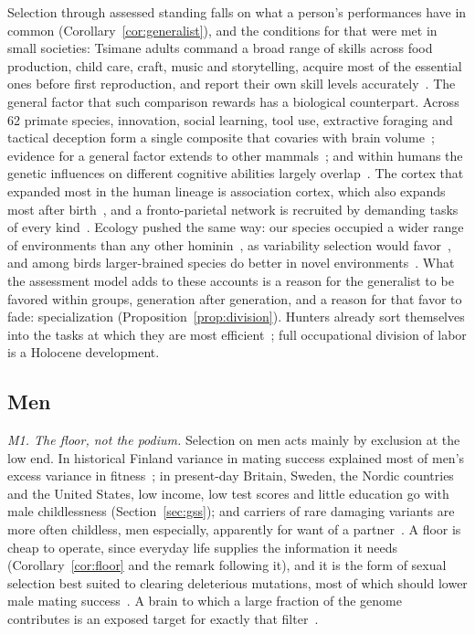 Selection through assessed standing falls on what a person's performances have in common
(Corollary~\ref{cor:generalist}), and the conditions for that were met in small societies: Tsimane adults command a broad
range of skills across food production, child care, craft, music and storytelling, acquire most of the essential ones before
first reproduction, and report their own skill levels accurately~\cite{schniter2015}. The general factor that such comparison
rewards has a biological counterpart. Across 62 primate species, innovation, social learning, tool use, extractive
foraging and tactical deception form a single composite that covaries with brain volume~\cite{reader2011}; evidence for a
general factor extends to other mammals~\cite{burkart2017}; and within humans the genetic influences on different cognitive
abilities largely overlap~\cite{kovas2006,plomin2015}. The cortex that expanded most in the human lineage is association cortex,
which also expands most after birth~\cite{hill2010,buckner2013}, and a fronto-parietal network is recruited by demanding tasks of
every kind~\cite{duncan2010}. Ecology pushed the same way: our species occupied a wider range of environments than any other
hominin~\cite{roberts2018}, as variability selection would favor~\cite{potts1998}, and among birds larger-brained species do better
in novel environments~\cite{sol2005}. What the assessment model adds to these accounts is a reason for the generalist
to be favored within groups, generation after generation, and a reason for that favor to fade: specialization
(Proposition~\ref{prop:division}). Hunters already sort themselves into the tasks at which they are most
efficient~\cite{hooper2015}; full occupational division of labor is a Holocene development.

\subsection{Men}

\emph{M1. The floor, not the podium.} Selection on men acts mainly by exclusion at the low end. In historical Finland variance
in mating success explained most of men's excess variance in fitness~\cite{courtiol2012}; in present-day Britain, Sweden, the
Nordic countries and the United States, low income, low test scores and little education go with male childlessness
(Section~\ref{sec:gss}); and carriers of rare damaging variants are more often childless, men especially, apparently for want
of a partner~\cite{gardner2022}. A floor is cheap to operate, since everyday life supplies the information it needs
(Corollary~\ref{cor:floor} and the remark following it), and it is the form of sexual selection best suited to clearing
deleterious mutations, most of which should lower male mating success~\cite{whitlock2009,lumley2015}. A brain to which a large
fraction of the genome contributes is an exposed target for exactly that filter~\cite{keller2006}.


